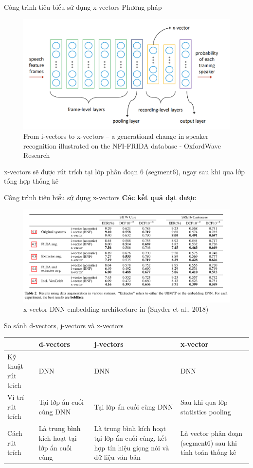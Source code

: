 \documentclass[notheorems, aspectratio=54]{beamer}
\begin{document}
\begin{frame}{Công trình tiêu biểu sử dụng x-vectors}
	Phương pháp
	\begin{figure}[H]
		\centering
		\includegraphics[width=0.75\linewidth]{images/x_vectors_dnn.png}
		\caption{From i-vectors to x-vectors – a generational change in speaker recognition illustrated on the NFI-FRIDA database - OxfordWave Research}
		\label{fig:writing-thesis}
	\end{figure}
	x-vectors sẽ được rút trích tại lớp phân đoạn 6 (segment6), ngay sau khi qua lớp tổng hợp thống kê
\end{frame}
\begin{frame}{Công trình tiêu biểu sử dụng x-vectors}
	\textbf{Các kết quả đạt được}
	\begin{figure}[H]
		\centering
		\includegraphics[width=1\linewidth]{images/x-vectors-result-table-02.png}
		\caption{x-vector DNN embedding architecture in (Snyder et al., 2018)}
		\label{fig:writing-thesis}
	\end{figure}
\end{frame}
\begin{frame}{So sánh d-vectors, j-vectors và x-vectors}
	\begin{table}[H]
		\centering
		\begin{tabular}{ |p{1cm} |p{3cm} | p{3cm} | p{3cm}  |}\hline
			& d-vectors & j-vectors & x-vector \\\hline
			Kỹ thuật rút trích & DNN & DNN & DNN\\ \hline
			Ví trí rút trích & Tại lớp ẩn cuối cùng DNN & Tại lớp ẩn cuối cùng DNN & Sau khi qua lớp statistics pooling\\\hline
			Cách rút trích & Là trung bình kích hoạt tại lớp ẩn cuối cùng & Là trung bình kích hoạt tại lớp ẩn cuối cùng, kết hợp tín hiệu giọng nói và dữ liệu văn bản & Là vector phân đoạn (segment6) sau khi tính toán thống kê\\\hline
		\end{tabular}
	\end{table}
\end{frame}
\end{document}
